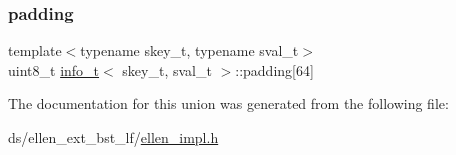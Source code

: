 \mbox{\label{unioninfo__t_a4ebfec4af276b167babd6ce6e9536efe}} 
\subsubsection{\texorpdfstring{padding}{padding}}
{\footnotesize\ttfamily template$<$typename skey\+\_\+t, typename sval\+\_\+t$>$ \\
uint8\+\_\+t \hyperlink{unioninfo__t}{info\+\_\+t}$<$ skey\+\_\+t, sval\+\_\+t $>$\+::padding\mbox{[}64\mbox{]}}



The documentation for this union was generated from the following file\+:\begin{DoxyCompactItemize}
\item 
ds/ellen\+\_\+ext\+\_\+bst\+\_\+lf/\hyperlink{ellen__impl_8h}{ellen\+\_\+impl.\+h}\end{DoxyCompactItemize}
